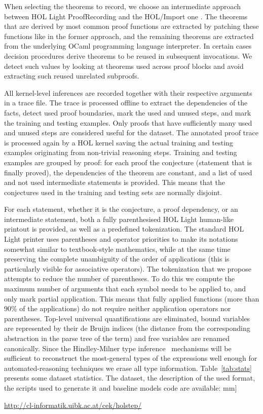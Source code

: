\documentclass[]{article}
\begin{document}
When selecting the theorems to record, we choose an intermediate approach
between HOL Light ProofRecording \citep{importold} and the HOL/Import one
\citep{importnew}. The theorems that are derived by most common proof
functions are extracted by patching these functions like in the former approach,
and the remaining theorems are extracted from the underlying OCaml programming
language interpreter. In certain cases decision procedures derive theorems
to be reused in subsequent invocations. We detect such values by looking
at theorems used across proof blocks and avoid extracting such reused unrelated
subproofs.

All kernel-level inferences are recorded together with their respective arguments
in a trace file. The trace is processed offline to extract the dependencies of the facts,
detect used proof boundaries,  mark the used and unused steps, and mark the training
and testing examples. Only proofs that have sufficiently many used and unused
steps are considered useful for the dataset. The annotated proof trace
is processed again by a HOL kernel saving the actual training and testing examples
originating from non-trivial reasoning steps. Training and testing examples are grouped by
proof: for each proof the conjecture (statement that is finally proved), the
dependencies of the theorem are constant, and a list of used and not used
intermediate statements is provided. This means that the conjectures used in the
training and testing sets are normally disjoint.

For each statement, whether it is the conjecture, a proof dependency, or an
intermediate statement, both a fully parenthesised HOL Light human-like printout
is provided, as well as a predefined tokenization. The standard HOL Light printer
uses parentheses and operator priorities to make its notations somewhat similar
to textbook-style mathematics, while at the same time preserving the complete
unambiguity of the order of applications (this is particularly visible for
associative operators). The tokenization that we propose attempts to reduce
the number of parentheses. To do this we compute the maximum number of arguments
that each symbol needs to be applied to, and only mark partial application. This
means that fully applied functions (more than 90\% of the applications) do not
require neither application operators nor parentheses. Top-level universal quantifications
are eliminated, bound variables are represented by their de Bruijn indices (the distance from the corresponding abstraction in the parse tree of the term) and free
variables are renamed canonically. Since the Hindley-Milner type inference~\cite{hindley1969principal} mechanisms
will be sufficient to reconstruct the most-general types of the expressions well enough for
automated-reasoning techniques \citet{alignedcorpora} we erase all type information.
Table~\ref{tab:stats} presents some dataset statistics.
The dataset, the description of the used format, the scripts used to generate it and baseline models code are available: \1mm]
\centerline{\url{http://cl-informatik.uibk.ac.at/cek/holstep/}}
\end{document}
